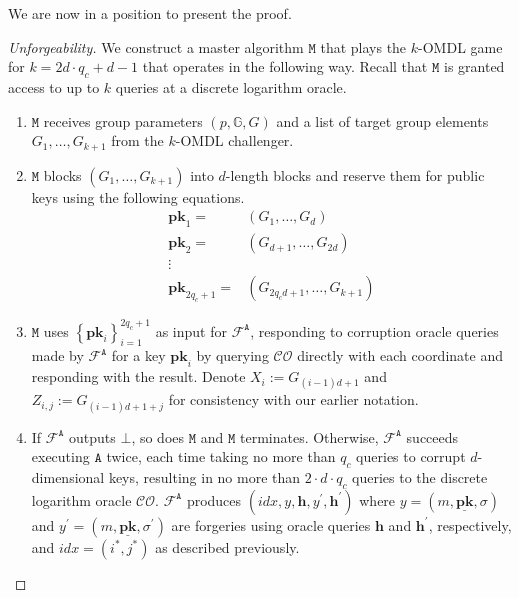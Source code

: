 \documentclass[draft]{llncs} %
\begin{document}
We are now in a position to present the proof.

\begin{proof}[Unforgeability]
We construct a master algorithm $\texttt{M}$ that plays the $k$-OMDL game for $k=2d\cdot q_c + d-1$ that operates in the following way. Recall that $\texttt{M}$ is granted access to up to $k$ queries at a discrete logarithm oracle.
\begin{enumerate}

\item $\texttt{M}$ receives group parameters $(p, \mathbb{G}, G)$ and a list of target group elements $G_1, \ldots, G_{k+1}$ from the $k$-OMDL challenger.

\item $\texttt{M}$ blocks $(G_1, \ldots, G_{k+1})$ into $d$-length blocks and reserve them for public keys using the following equations.
\begin{align*}
\textbf{pk}_1 =& (G_1, \ldots, G_d) \\
\textbf{pk}_2 =& (G_{d+1}, \ldots, G_{2d}) \\
\vdots & \\
\textbf{pk}_{2q_c + 1} =& (G_{2q_c d+1}, \ldots, G_{k+1})
\end{align*}

\item $\texttt{M}$ uses $\left\{\textbf{pk}_i\right\}_{i=1}^{2q_c + 1}$ as input for $\mathcal{F}^{\texttt{A}}$, responding to corruption oracle queries made by $\mathcal{F}^{\texttt{A}}$ for a key $\textbf{pk}_i$ by querying $\mathcal{CO}$ directly with each coordinate and responding with the result. Denote $X_i := G_{(i-1)d + 1}$ and $Z_{i,j} := G_{(i-1)d + 1 + j}$ for consistency with our earlier notation.

\item If $\mathcal{F}^{\texttt{A}}$ outputs $\bot$, so does $\texttt{M}$ and $\texttt{M}$ terminates. Otherwise, $\mathcal{F}^{\texttt{A}}$ succeeds executing $\texttt{A}$ twice, each time taking no more than $q_c$ queries to corrupt $d$-dimensional keys, resulting in no more than $2\cdot d\cdot q_c$ queries to the discrete logarithm oracle $\mathcal{CO}$. $\mathcal{F}^{\texttt{A}}$ produces $(\textit{idx}, y, \textbf{h}, y^\prime, \textbf{h}^\prime)$ where $y = (m, \underline{\textbf{pk}}, \sigma)$ and $y^\prime = (m, \underline{\textbf{pk}}, \sigma^\prime)$ are forgeries using oracle queries $\textbf{h}$ and $\textbf{h}^\prime$, respectively, and $\textit{idx} = (i^*, j^*)$ as described previously.


\end{enumerate}
\end{proof}
\end{document}
